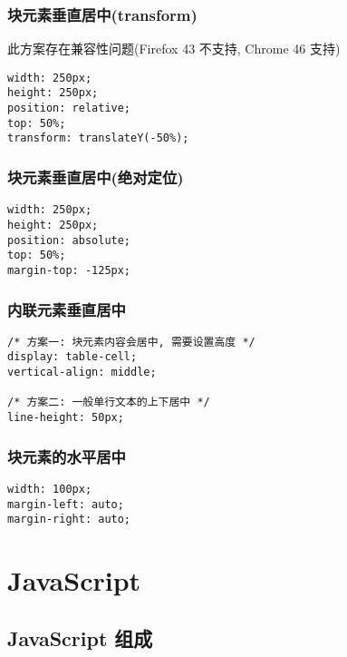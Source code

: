 \subsubsection{块元素垂直居中(transform)}\label{ux5757ux5143ux7d20ux5782ux76f4ux5c45ux4e2dtransform}

此方案存在兼容性问题(Firefox 43 不支持, Chrome 46 支持)

\begin{lstlisting}
width: 250px;
height: 250px;
position: relative;
top: 50%;
transform: translateY(-50%);
\end{lstlisting}

\subsubsection{块元素垂直居中(绝对定位)}\label{ux5757ux5143ux7d20ux5782ux76f4ux5c45ux4e2dux7eddux5bf9ux5b9aux4f4d}

\begin{lstlisting}
width: 250px;
height: 250px;
position: absolute;
top: 50%;
margin-top: -125px;
\end{lstlisting}

\subsubsection{内联元素垂直居中}\label{ux5185ux8054ux5143ux7d20ux5782ux76f4ux5c45ux4e2d}

\begin{lstlisting}
/* 方案一: 块元素内容会居中, 需要设置高度 */
display: table-cell;
vertical-align: middle;

/* 方案二: 一般单行文本的上下居中 */
line-height: 50px;
\end{lstlisting}

\subsubsection{块元素的水平居中}\label{ux5757ux5143ux7d20ux7684ux6c34ux5e73ux5c45ux4e2d}

\begin{lstlisting}
width: 100px;
margin-left: auto;
margin-right: auto;
\end{lstlisting}

\section{JavaScript}\label{javascript}

\subsection{JavaScript 组成}\label{javascript-ux7ec4ux6210}

